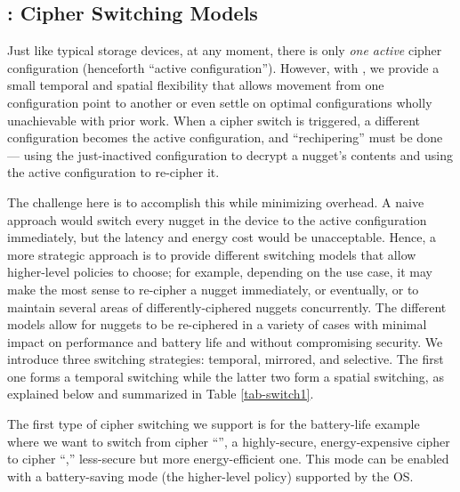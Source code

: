

\subsection{\sysA: Cipher Switching Models} 
\label{subsec:strategies}




Just like typical storage devices, at any moment, there is only {\em one active} cipher
configuration (henceforth ``active configuration'').  However, with \sysA, we
provide a small temporal and spatial flexibility that allows movement
from one configuration point to another or even settle on optimal
configurations wholly unachievable with prior work.  When a cipher switch
is triggered, a different configuration becomes the active configuration,
and ``rechipering'' must be done --- using the just-inactived
configuration to decrypt a nugget's contents and using the active
configuration to re-cipher it.

The challenge here is to accomplish this while minimizing overhead.  A
naive approach would switch every nugget in the device to the active
configuration immediately, but the latency and energy cost would be
unacceptable.  Hence, a more strategic approach is to provide different
switching models that allow higher-level policies to choose; for example,
depending on the use case, it may make the most sense to re-cipher a
nugget immediately, or eventually, or to maintain several areas of
differently-ciphered nuggets concurrently.  The different models allow for
nuggets to be re-ciphered in a variety of cases with minimal impact on
performance and battery life and without compromising security.  We
introduce three switching strategies: temporal, mirrored, and selective.
The first one forms a temporal switching while the latter two form a
spatial switching, as explained below and summarized in Table
\ref{tab-switch1}.







  The first type of cipher switching we support
is for the battery-life example where we want to switch from cipher
``\cone'', a highly-secure, energy-expensive cipher to cipher ``\ctwo,''
less-secure but more energy-efficient one.  This mode can be enabled with
a battery-saving mode (the higher-level policy) supported by the OS.

